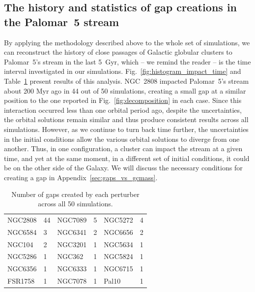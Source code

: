 \documentclass{aa}
\begin{document}
  \subsection{The history and statistics of gap creations in the Palomar~5 stream}\label{sect:history}
  
    By applying the methodology described above to the whole set of simulations, we can reconstruct the history of close passages of Galactic globular clusters to Palomar~5's stream in the last 5~Gyr, which -- we remind the reader -- is the time interval investigated in our simulations.  Fig.~\ref{fig:histogram_impact_time} and Table~\ref{tab:gaps_per_perturber} present results of this analysis. NGC~2808 impacted Palomar~5's stream about 200 Myr ago in 44 out of 50 simulations, creating a small gap at a similar position to the one reported in Fig.~\ref{fig:decomposition} in each case. Since this interaction occurred less than one orbital period ago, despite the uncertainties, the orbital solutions remain similar and thus produce consistent results across all simulations. However, as we continue to turn back time further, the uncertainties in the initial conditions allow the various orbital solutions to diverge from one another. Thus, in one configuration, a cluster can impact the stream at a given time, and yet at the same moment, in a different set of initial conditions, it could be on the other side of the Galaxy. We will discuss the necessary conditions for creating a gap in Appendix~\ref{sec:gaps_vs_gcmass}. 


    
    

    \begin{table}[h]
      \centering
      \caption{Number of gaps created by each perturber across all 50 simulations.}
      \label{tab:gaps_per_perturber}
      \begin{tabular}{|ll|ll|ll|}
      \hline
      NGC2808 & 44 & NGC7089 & 5 & NGC5272 & 4 \\
      NGC6584 & 3 & NGC6341 & 2 & NGC6656 & 2 \\
      NGC104 & 2 & NGC3201 & 1 & NGC5634 & 1 \\
      NGC5286 & 1 & NGC362 & 1 & NGC5824 & 1 \\
      NGC6356 & 1 & NGC6333 & 1 & NGC6715 & 1 \\
      FSR1758 & 1 & NGC7078 & 1 & Pal10 & 1 \\
      \hline
      \end{tabular}
    \end{table} 
    
\end{document}
